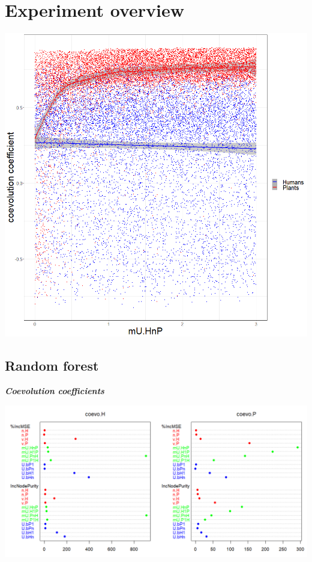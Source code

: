 \documentclass[]{book}
\begin{document}
\newpage

\hypertarget{experiment-overview}{%
\section{Experiment overview}\label{experiment-overview}}

\includegraphics[width=1\linewidth]{plots/5_multiplePar-coevo_collapsed-ggplot}

\newpage

\hypertarget{random-forest}{%
\subsection{Random forest}\label{random-forest}}

\textbf{\emph{Coevolution coefficients}}

\includegraphics[width=1\linewidth]{plots/5_multiplePar-rf-coevo}
\end{document}
